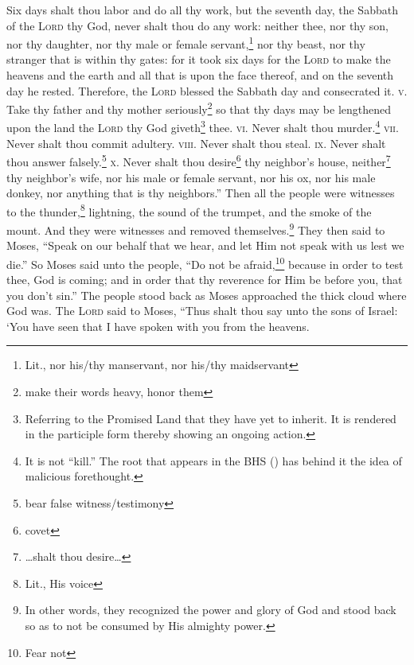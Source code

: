 \begin{enumerate}[align=center]
     Six days shalt thou labor and do all thy work,%
     but the seventh day, the Sabbath of the \textsc{Lord} thy God, never shalt thou do any work: neither thee, nor thy son, nor thy daughter, nor thy male or female servant,\footnote{Lit., nor his/thy manservant, nor his/thy maidservant} nor thy beast, nor thy stranger that is within thy gates:%
     for it took six days for the \textsc{Lord} to make the heavens and the earth and all that is upon the face thereof, and on the seventh day he rested. Therefore, the \textsc{Lord} blessed the Sabbath day and consecrated it.%
     \textsc{v.} Take thy father and thy mother seriously\footnote{make their words heavy, honor them} so that thy days may be lengthened upon the land the \textsc{Lord} thy God giveth\footnote{Referring to the Promised Land that they have yet to inherit. It is rendered in the participle form thereby showing an ongoing action.} thee.%
     \textsc{vi.} Never shalt thou murder.\footnote{It is not ``kill.'' The root that appears in the BHS () has behind it the idea of malicious forethought.}%
     \textsc{vii.} Never shalt thou commit adultery.%
     \textsc{viii.} Never shalt thou steal.%
     \textsc{ix.} Never shalt thou answer falsely.\footnote{bear false witness/testimony}%
     \textsc{x.} Never shalt thou desire\footnote{covet} thy neighbor's house, neither\footnote{\dots shalt thou desire\dots} thy neighbor's wife, nor his male or female servant, nor his ox, nor his male donkey, nor anything that is thy neighbors.''%
     Then all the people were witnesses to the thunder,\footnote{Lit., His voice} lightning, the sound of the trumpet, and the smoke of the mount. And they were witnesses and removed themselves.\footnote{In other words, they recognized the power and glory of God and stood back so as to not be consumed by His almighty power.}%
     They then said to Moses, ``Speak on our behalf that we hear, and let Him not speak with us lest we die.''%
     So Moses said unto the people, ``Do not be afraid,\footnote{Fear not} because in order to test thee, God is coming; and in order that thy reverence for Him be before you, that you don't sin.''%
     The people stood back as Moses approached the thick cloud where God was.%
     The \textsc{Lord} said to Moses, ``Thus shalt thou say unto the sons of Israel: `You have seen that I have spoken with you from the heavens.%

\end{enumerate}
